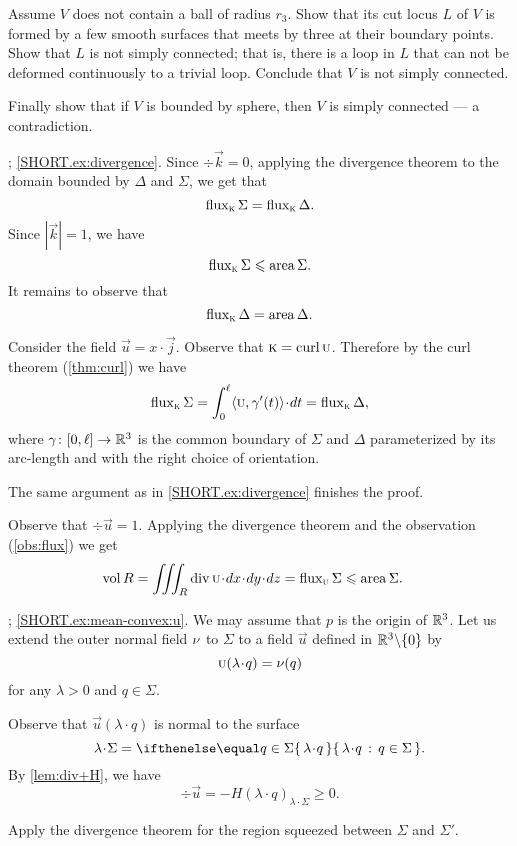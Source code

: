Assume $V$ does not contain a ball of radius $r_3$.
Show that its cut locus $L$ of $V$ is formed by a few smooth surfaces that meets by three at their boundary points.
Show that $L$ is not simply connected; that is, there is a loop in $L$ that can not be deformed continuously to a trivial loop.
Conclude that $V$ is not simply connected.

Finally show that if $V$ is bounded by sphere, then $V$ is simply connected --- a contradiction. 

\parbf{\ref{ex:divergence-1}}; \ref{SHORT.ex:divergence}.
Since $\div\vec k=0$, applying the divergence theorem to the domain bounded by $\Delta$ and $\Sigma$, we get that 
\[\mathop{\rm flux}\nolimits_{\textsc k}\Sigma=\mathop{\rm flux}\nolimits_{\textsc k}\Delta.\]
Since $|\vec k|=1$, we have 
\[\mathop{\rm flux}\nolimits_{\textsc k}\Sigma\leqslant \mathop{\rm area}\nolimits\Sigma.\]
It remains to observe that
\[\mathop{\rm flux}\nolimits_{\textsc k}\Delta=\mathop{\rm area}\nolimits\Delta.\]


 Consider the field $\vec u=x\cdot\vec j$.
Observe that $\textsc k=\mathop{\rm curl}\nolimits \textsc u$.
Therefore by the curl theorem (\ref{thm:curl}) we have 
\[\flux_{\vec k}\Sigma
=
\int_0^\ell\langle\vec u,\gamma'(t)\rangle\cdot dt
=
\flux_{\vec k}\Delta,\]
where $\gamma\colon[0,\ell]\to\mathbb{R}^3$ is the common boundary of $\Sigma$ and $\Delta$ parameterized by its arc-length and with the right choice of orientation.

The same argument as in \ref{SHORT.ex:divergence} finishes the proof.



Observe that $\div\vec u=1$.
Applying the divergence theorem and the observation (\ref{obs:flux}) we get
\begin{align*}
\vol R&=\iiint_R\div\vec u\cdot dx\cdot dy\cdot dz
=
\flux_{\vec u}\Sigma
\le
\area\Sigma.
\end{align*}




\parbf{\ref{ex:mean-convex}}; \ref{SHORT.ex:mean-convex:u}.
We may assume that $p$ is the origin of $\mathbb{R}^3$.
Let us extend the outer normal field $\nu$ to $\Sigma$ to a field $\vec u$ defined in $\mathbb{R}^3\backslash\{0\}$ by
\[\vec u(\lambda\cdot q)=\Norm(q)\]
for any $\lambda>0$ and $q\in\Sigma$.

Observe that $\vec u(\lambda\cdot q)$ is normal to the surface 
\[\lambda\cdot\Sigma=\set{\lambda\cdot q}{q\in\Sigma}.\]
By \ref{lem:div+H}, we have
\[\div \vec u=-H(\lambda\cdot q)_{\lambda\cdot\Sigma}\ge 0.\]

 Apply the divergence theorem for the region squeezed between $\Sigma$ and $\Sigma'$.

